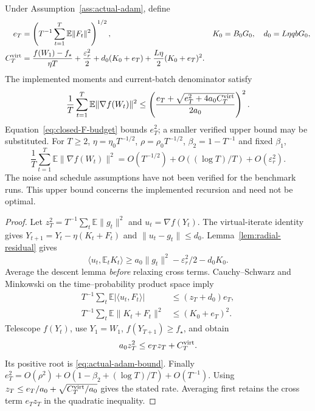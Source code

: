 \begin{theorem}
\label{thm:actual-adam}
Under Assumption~\ref{ass:actual-adam}, define
\begin{align}
 e_T&=\left(T^{-1}\sum_{t=1}^T\mathbb E\|F_t\|^2\right)^{1/2},&
 K_0&=B_0G_0,\quad d_0=L\eta qbG_0,\\
 C_T^{\rm virt}&=\frac{f(W_1)-f_\star}{\eta T}
       +\frac{\varepsilon_r^2}{2}
       +d_0(K_0+e_T)+\frac{L\eta}{2}(K_0+e_T)^2.
\end{align}
The implemented moments and current-batch denominator satisfy
\begin{equation}
 \frac1T\sum_{t=1}^T\mathbb E\|\nabla f(W_t)\|^2
 \le\left(\frac{e_T+\sqrt{e_T^2+4a_0 C_T^{\rm virt}}}{2a_0}\right)^2.
 \label{eq:actual-adam-bound}
\end{equation}
Equation~\eqref{eq:closed-F-budget} bounds $e_T^2$; a smaller verified
upper bound may be substituted.
For $T\ge2$, $\eta=\eta_0T^{-1/2}$, $\rho=\rho_0T^{-1/2}$,
$\beta_2=1-T^{-1}$ and fixed $\beta_1$,
\begin{equation}
 \frac1T\sum_{t=1}^T\mathbb E\|\nabla f(W_t)\|^2
 =O(T^{-1/2})+O((\log T)/T)+O(\varepsilon_r^2).
 \label{eq:actual-adam-rate}
\end{equation}
The noise and schedule assumptions have not been verified for the benchmark
runs. This upper bound concerns the implemented recursion and need not be optimal.
\end{theorem}
\begin{proof}
Let $z_T^2=T^{-1}\sum_t\mathbb E\|g_t\|^2$ and
$u_t=\nabla f(Y_t)$. The virtual-iterate identity gives
$Y_{t+1}=Y_t-\eta(K_t+F_t)$ and
$\|u_t-g_t\|\le d_0$. Lemma~\ref{lem:radial-residual} gives
\begin{equation}
 \langle u_t,\mathbb E_tK_t\rangle
 \ge a_0\|g_t\|^2-\varepsilon_r^2/2-d_0K_0.
\end{equation}
Average the descent lemma \emph{before} relaxing cross terms.
Cauchy--Schwarz and Minkowski on the time--probability product space imply
\begin{align}
 T^{-1}\sum_t\mathbb E|\langle u_t,F_t\rangle|
 &\le(z_T+d_0)e_T,\\
 T^{-1}\sum_t\mathbb E\|K_t+F_t\|^2&\le(K_0+e_T)^2.
\end{align}
Telescope $f(Y_t)$, use $Y_1=W_1$, $f(Y_{T+1})\ge f_\star$, and obtain
\begin{equation}
 a_0 z_T^2\le e_Tz_T+C_T^{\rm virt}.
\end{equation}
Its positive root is \eqref{eq:actual-adam-bound}. Finally
$e_T^2=O(\rho^2)+O(1-\beta_2+(\log T)/T)+O(T^{-1})$.
Using $z_T\le e_T/a_0+\sqrt{C_T^{\rm virt}/a_0}$ gives the stated rate.
Averaging first retains the cross term $e_Tz_T$ in the quadratic inequality.
\end{proof}

